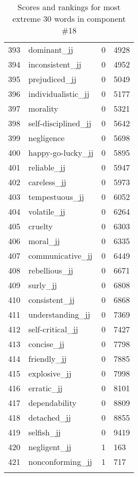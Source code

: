 \begin{longtable}[!htbp]{| rlr@{.}l |}
    393 & dominant\_jj & 0 & 4928 \\
    394 & inconsistent\_jj & 0 & 4952 \\
    395 & prejudiced\_jj & 0 & 5049 \\
    396 & individualistic\_jj & 0 & 5177 \\
    397 & morality & 0 & 5321 \\
    398 & self-disciplined\_jj & 0 & 5642 \\
    399 & negligence & 0 & 5698 \\
    400 & happy-go-lucky\_jj & 0 & 5895 \\
    401 & reliable\_jj & 0 & 5947 \\
    402 & careless\_jj & 0 & 5973 \\
    403 & tempestuous\_jj & 0 & 6052 \\
    404 & volatile\_jj & 0 & 6264 \\
    405 & cruelty & 0 & 6303 \\
    406 & moral\_jj & 0 & 6335 \\
    407 & communicative\_jj & 0 & 6449 \\
    408 & rebellious\_jj & 0 & 6671 \\
    409 & surly\_jj & 0 & 6808 \\
    410 & consistent\_jj & 0 & 6868 \\
    411 & understanding\_jj & 0 & 7369 \\
    412 & self-critical\_jj & 0 & 7427 \\
    413 & concise\_jj & 0 & 7798 \\
    414 & friendly\_jj & 0 & 7885 \\
    415 & explosive\_jj & 0 & 7998 \\
    416 & erratic\_jj & 0 & 8101 \\
    417 & dependability & 0 & 8809 \\
    418 & detached\_jj & 0 & 8855 \\
    419 & selfish\_jj & 0 & 9419 \\
    420 & negligent\_jj & 1 & 163 \\
    421 & nonconforming\_jj & 1 & 717 \\
    \hline
    \caption{Scores and rankings for most extreme 30 words in component \#18} \\
\end{longtable}

